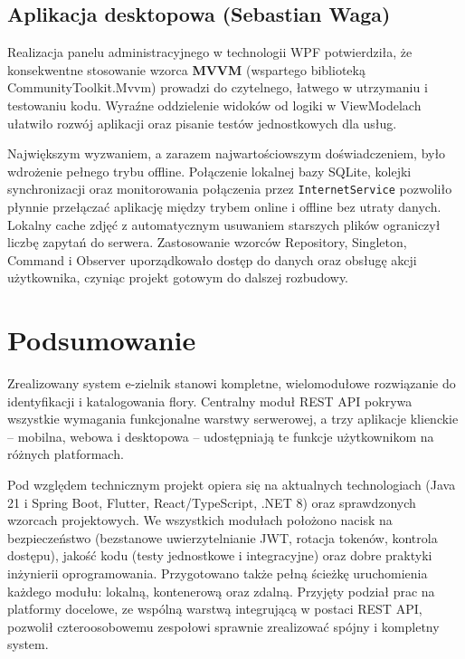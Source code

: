 \documentclass[12pt,a4paper]{article}
\begin{document}
\subsection{Aplikacja desktopowa (Sebastian Waga)}

Realizacja panelu administracyjnego w technologii WPF potwierdzi\l{}a, \.ze konsekwentne stosowanie wzorca \textbf{MVVM} (wspartego bibliotek\k{a} CommunityToolkit.Mvvm) prowadzi do czytelnego, \l{}atwego w utrzymaniu i testowaniu kodu. Wyra\'zne oddzielenie widok\'ow od logiki w ViewModelach u\l{}atwi\l{}o rozw\'oj aplikacji oraz pisanie test\'ow jednostkowych dla us\l{}ug.

Najwi\k{e}kszym wyzwaniem, a zarazem najwarto\'sciowszym do\'swiadczeniem, by\l{}o wdro\.zenie pe\l{}nego trybu offline. Po\l{}\k{a}czenie lokalnej bazy SQLite, kolejki synchronizacji oraz monitorowania po\l{}\k{a}czenia przez \texttt{InternetService} pozwoli\l{}o p\l{}ynnie prze\l{}\k{a}cza\'c aplikacj\k{e} mi\k{e}dzy trybem online i offline bez utraty danych. Lokalny cache zdj\k{e}\'c z automatycznym usuwaniem starszych plik\'ow ograniczy\l{} liczb\k{e} zapyta\'n do serwera. Zastosowanie wzorc\'ow Repository, Singleton, Command i Observer uporz\k{a}dkowa\l{}o dost\k{e}p do danych oraz obs\l{}ug\k{e} akcji u\.zytkownika, czyni\k{a}c projekt gotowym do dalszej rozbudowy.

\section{Podsumowanie}

Zrealizowany system e-zielnik stanowi kompletne, wielomodu\l{}owe rozwi\k{a}zanie do identyfikacji i katalogowania flory. Centralny modu\l{} REST API pokrywa wszystkie wymagania funkcjonalne warstwy serwerowej, a trzy aplikacje klienckie -- mobilna, webowa i desktopowa -- udost\k{e}pniaj\k{a} te funkcje u\.zytkownikom na r\'o\.znych platformach.

Pod wzgl\k{e}dem technicznym projekt opiera si\k{e} na aktualnych technologiach (Java 21 i Spring Boot, Flutter, React/TypeScript, .NET 8) oraz sprawdzonych wzorcach projektowych. We wszystkich modu\l{}ach po\l{}o\.zono nacisk na bezpiecze\'nstwo (bezstanowe uwierzytelnianie JWT, rotacja token\'ow, kontrola dost\k{e}pu), jako\'s\'c kodu (testy jednostkowe i integracyjne) oraz dobre praktyki in\.zynierii oprogramowania. Przygotowano tak\.ze pe\l{}n\k{a} \'scie\.zk\k{e} uruchomienia ka\.zdego modu\l{}u: lokaln\k{a}, kontenerow\k{a} oraz zdaln\k{a}. Przyj\k{e}ty podzia\l{} prac na platformy docelowe, ze wsp\'oln\k{a} warstw\k{a} integruj\k{a}c\k{a} w postaci REST API, pozwoli\l{} czteroosobowemu zespo\l{}owi sprawnie zrealizowa\'c sp\'ojny i kompletny system.
\end{document}
